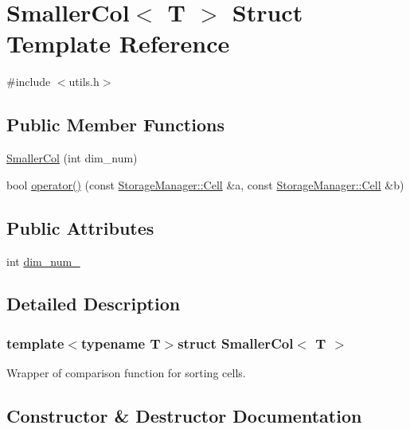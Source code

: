 \hypertarget{structSmallerCol}{}\section{Smaller\+Col$<$ T $>$ Struct Template Reference}
\label{structSmallerCol}


{\ttfamily \#include $<$utils.\+h$>$}

\subsection*{Public Member Functions}
\begin{DoxyCompactItemize}
\item 
\hyperlink{structSmallerCol_a0a6c0becb7633f64566764caf057f550}{Smaller\+Col} (int dim\+\_\+num)
\item 
bool \hyperlink{structSmallerCol_af746a28b252523658e1aa6719681dbe9}{operator()} (const \hyperlink{structStorageManager_1_1Cell}{Storage\+Manager\+::\+Cell} \&a, const \hyperlink{structStorageManager_1_1Cell}{Storage\+Manager\+::\+Cell} \&b)
\end{DoxyCompactItemize}
\subsection*{Public Attributes}
\begin{DoxyCompactItemize}
\item 
int \hyperlink{structSmallerCol_a88b833229d7666dc6789ed4a2a243d60}{dim\+\_\+num\+\_\+}
\end{DoxyCompactItemize}


\subsection{Detailed Description}
\subsubsection*{template$<$typename T$>$struct Smaller\+Col$<$ T $>$}

Wrapper of comparison function for sorting cells. 

\subsection{Constructor \& Destructor Documentation}
\hypertarget{structSmallerCol_a0a6c0becb7633f64566764caf057f550}{}
